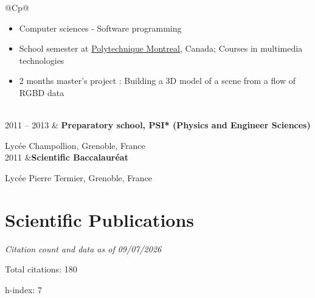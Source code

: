 \documentclass[11pt,a4paper]{article}
\newlength{\colone}
\newlength{\coltwo}
\newcommand{\notes}[1]{{\small\color{gray}\itshape #1}}
\newcommand{\me}{{\bfseries M. Jacquet}}
\begin{document}
\begin{longtable}{@{}C{\colone}p{\coltwo}@{}}
{\begin{itemize}
				\item Computer sciences - Software programming
				\item School semester at \href{http://www.polymtl.ca/}{Polytechnique Montreal}, Canada; Courses in multimedia technologies \par
			    \item 2 months master's project : Building a 3D model of a scene from a flow of RGBD data
			\end{itemize}
		}
\\
	2011 -- 2013
		& {\bfseries Preparatory school, PSI* (Physics and Engineer Sciences)}\par
    	{\small Lycée Champollion, Grenoble, France}
\\
	2011
		&{\bfseries Scientific Baccalauréat}\par
		{\small Lycée Pierre Termier, Grenoble, France}
\end{longtable}


\section{Scientific Publications}
\notes{Citation count and data as of 09/07/2026 \par
	Total citations: 180 \par
	h-index: 7 \par
}
\end{document}
